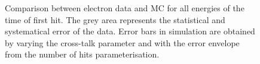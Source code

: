 \documentclass[twoside,a4paper,11pt]{article}
\begin{document}
\begin{figure}[htbp]
	\hfill
	\caption[]{Comparison between electron data and MC for all energies of the time of first hit. The grey area represents the statistical and systematical error of the data. Error bars in simulation are obtained by varying the cross-talk parameter and with the error envelope from the number of hits parameterisation.}
	\label{fig:sim_data_elec}
\end{figure}
\end{document}
